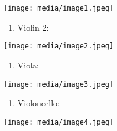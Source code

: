 \texttt{[image: media/image1.jpeg]}

\begin{enumerate}
\def\labelenumi{\arabic{enumi}.}
\item
  Violin 2:
\end{enumerate}

\texttt{[image: media/image2.jpeg]}

\begin{enumerate}
\def\labelenumi{\arabic{enumi}.}
\item
  Viola:
\end{enumerate}

\texttt{[image: media/image3.jpeg]}

\begin{enumerate}
\def\labelenumi{\arabic{enumi}.}
\item
  Violoncello:
\end{enumerate}

\texttt{[image: media/image4.jpeg]}

